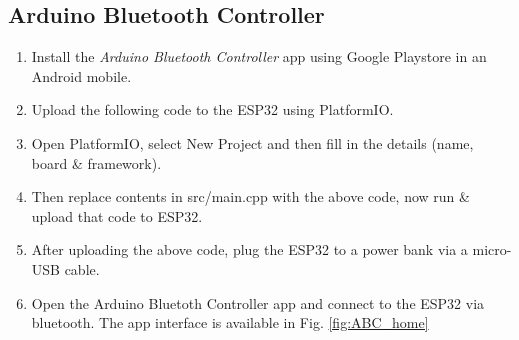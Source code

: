 \documentclass[conference]{IEEEtran}
\begin{document}
\subsection{Arduino Bluetooth Controller}
\begin{enumerate}

\item Install the {\em Arduino Bluetooth Controller} app using Google Playstore in an Android mobile.

\item Upload the following code to the ESP32 using PlatformIO.
\item Open PlatformIO, select New Project and then fill in the details (name, board \& framework).
\item Then replace contents in src/main.cpp with the above code, now run \& upload that code to ESP32.
\item After uploading the above code, plug the ESP32 to a power bank via a micro-USB cable.
\item Open the Arduino Bluetoth Controller app and connect to the ESP32 via bluetooth. The app interface is available in Fig. \ref{fig:ABC_home}
\begin{figure}[!h]
\centering
\resizebox{\columnwidth}{!}{%
}
\end{figure}
\end{enumerate}
\end{document}
